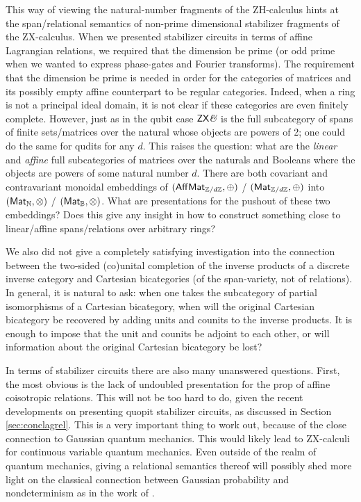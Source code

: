 This way of viewing the natural-number fragments of the ZH-calculus hints at the span/relational semantics of non-prime dimensional stabilizer fragments of the  ZX-calculus.  When we presented stabilizer circuits in terms of affine Lagrangian relations, we required that the dimension be prime (or odd prime when we wanted to express phase-gates and Fourier transforms).  The requirement that the dimension be prime is needed in order for the categories of matrices and its possibly empty affine counterpart to be regular categories.  Indeed,  when a ring is not a principal ideal domain, it is not clear if these categories are even finitely complete.  However, just as in the qubit case $\mathsf{ZX}\textit{\&}$ is the full subcategory of spans of finite sets/matrices over the natural whose objects are powers of 2; one could do the same for qudits for any $d$.  This raises the question: what are the {\em linear} and {\em affine} full subcategories of matrices over the naturals and Booleans where the objects are powers of some natural number $d$.  There are both covariant and contravariant monoidal embeddings of $(\mathsf{Aff}\mathsf{Mat}_{\mathbb{Z}/d\mathbb{Z}},\oplus)$ / $(\mathsf{Mat}_{\mathbb{Z}/d\mathbb{Z}},\oplus)$ into $(\mathsf{Mat}_{\mathbb{N}},\otimes)$ / $(\mathsf{Mat}_{\mathbb{B}},\otimes)$.  What are presentations for the pushout of these two embeddings?  Does this give any insight in how to construct something close to linear/affine spans/relations over arbitrary rings?

We also did not give a completely satisfying investigation into the connection between the two-sided (co)unital completion of the inverse products of a discrete inverse category and Cartesian bicategories (of the span-variety, not of relations).  In general, it is natural to ask: when one takes the subcategory of partial isomorphisms of a Cartesian bicategory, when will the original Cartesian bicategory be recovered by adding units and counits to the inverse products.  It is enough to impose that the unit and counits be adjoint to each other, or will information about the original Cartesian bicategory be lost?


In terms of stabilizer circuits there are also many unanswered questions.  First, the most obvious is the lack of undoubled presentation for the prop of affine coisotropic relations.  This will not be too hard to do, given the recent developments on presenting quopit stabilizer circuits, as discussed in Section \ref{sec:conclagrel}.  This is a very important thing to work out, because of the close connection to Gaussian quantum mechanics.  This would likely lead to ZX-calculi for continuous variable quantum mechanics.  Even outside of the realm of quantum mechanics, giving  a relational semantics thereof will possibly shed more light on the classical connection between Gaussian probability and nondeterminism as in the work of \cite{stein}.


